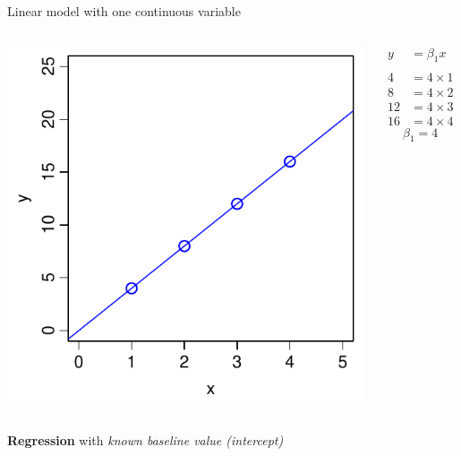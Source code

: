 \documentclass[xcolor=x11names,handout,compress]{beamer}
\renewcommand{\(}{\begin{columns}}
\renewcommand{\)}{\end{columns}}
\newcommand{\<}[1]{\begin{column}{#1}}
\renewcommand{\>}{\end{column}}
\begin{document}
\begin{frame}{Linear model with one continuous variable}

    \begin{columns}[T]
    
            \includegraphics[width=\textwidth]{Origin.pdf}
            
            \begin{align*}
              y  &=  \beta_1 x \\
              \\
              4  &=  4 \times 1 \\
              8  &=  4 \times 2 \\
              12 &=  4 \times 3 \\
              16 &=  4 \times 4   
            \end{align*}
            \[\beta_1 =4\]
    \end{columns}

\pause

\begin{center}
    {\bf Regression} with {\it known baseline value (intercept) }
\end{center}

\end{frame}
\end{document}
